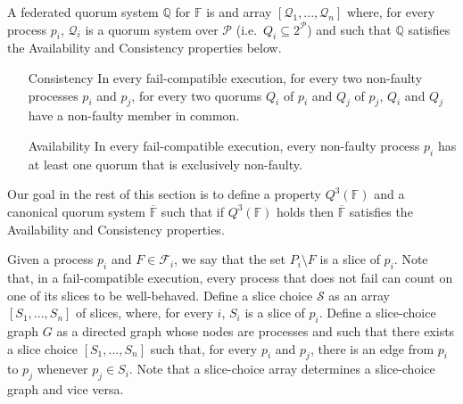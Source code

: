 \documentclass[11pt,letterpaper]{article}
\begin{document}
A federated quorum system $\mathbb{Q}$ for $\mathbb{F}$ is and array $\left[\mathcal{Q}_1,...,\mathcal{Q}_n\right]$ where, for every process $p_i$, $\mathcal{Q}_i$ is a quorum system over $\mathcal{P}$ (i.e.\ $Q_i\subseteq 2^{\mathcal{P}}$) and such that $\mathbb{Q}$ satisfies the Availability and Consistency properties below.
\begin{itemize}
  \item[Consistency] In every fail-compatible execution, for every two non-faulty processes $p_i$ and $p_j$, for every two quorums $Q_i$ of $p_i$ and $Q_j$ of $p_j$, $Q_i$ and $Q_j$ have a non-faulty member in common.
  \item[Availability] In every fail-compatible execution, every non-faulty process $p_i$  has at least one quorum that is exclusively non-faulty.
\end{itemize}

Our goal in the rest of this section is to define a property $Q^3(\mathbb{F})$ and a canonical quorum system $\overline{\mathbb{F}}$ such that if $Q^3(\mathbb{F})$ holds then $\overline{\mathbb{F}}$ satisfies the Availability and Consistency properties.



Given a process $p_i$ and $F\in \mathcal{F}_i$, we say that the set $P_i\setminus F$ is a slice of $p_i$.
Note that, in a fail-compatible execution, every process that does not fail can count on one of its slices to be well-behaved.
Define a slice choice $\mathcal{S}$ as an array $\left[S_1,...,S_n\right]$ of slices, where, for every $i$, $S_i$ is a slice of $p_i$.
Define a slice-choice graph $G$ as a directed graph whose nodes are processes and such that there exists a slice choice $\left[S_1,...,S_n\right]$ such that, for every $p_i$ and $p_j$, there is an edge from $p_i$ to $p_j$ whenever $p_j\in S_i$. Note that a slice-choice array determines a slice-choice graph and vice versa.
\end{document}
